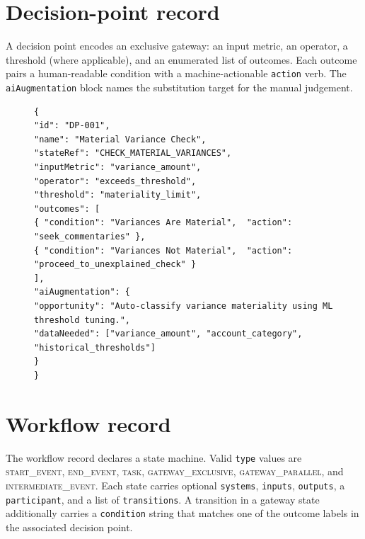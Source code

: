 \documentclass[11pt,a4paper,twoside]{report}
\begin{document}
\section{Decision-point record}\label{sec:decision-point-schema}

A decision point encodes an exclusive gateway: an input metric, an
operator, a threshold (where applicable), and an enumerated list of
outcomes. Each outcome pairs a human-readable condition with a
machine-actionable \texttt{action} verb. The \texttt{aiAugmentation}
block names the substitution target for the manual judgement.

\begin{figure}[htbp]
\begin{lstlisting}[language=jsonx,caption={\texttt{DP-001} material
variance gateway.},label=lst:dp-001]
{
"id": "DP-001",
"name": "Material Variance Check",
"stateRef": "CHECK_MATERIAL_VARIANCES",
"inputMetric": "variance_amount",
"operator": "exceeds_threshold",
"threshold": "materiality_limit",
"outcomes": [
{ "condition": "Variances Are Material",  "action": "seek_commentaries" },
{ "condition": "Variances Not Material",  "action": "proceed_to_unexplained_check" }
],
"aiAugmentation": {
"opportunity": "Auto-classify variance materiality using ML threshold tuning.",
"dataNeeded": ["variance_amount", "account_category", "historical_thresholds"]
}
}
\end{lstlisting}
\end{figure}

\section{Workflow record}\label{sec:workflow-schema}

The workflow record declares a state machine. Valid \texttt{type}
values are \textsc{start\_event}, \textsc{end\_event}, \textsc{task},
\textsc{gateway\_exclusive}, \textsc{gateway\_parallel}, and
\textsc{intermediate\_event}. Each state carries optional
\texttt{systems}, \texttt{inputs}, \texttt{outputs}, a
\texttt{participant}, and a list of \texttt{transitions}. A transition
in a gateway state additionally carries a \texttt{condition} string
that matches one of the outcome labels in the associated decision
point.
\end{document}
